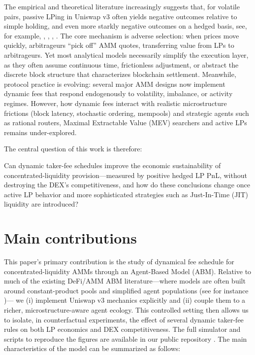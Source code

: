 \documentclass[11pt]{article}
\begin{document}
The empirical and theoretical literature increasingly suggests that, for volatile pairs, passive LPing in Uniswap v3 often yields negative outcomes relative 
to simple holding, and even more starkly negative outcomes on a hedged basis, see, for example, \cite{fritsch2024}, \cite{heimbach2022}, \cite{cohen2023}, \cite{cartea2023}. 
The core mechanism is adverse selection: when prices move quickly, arbitrageurs “pick off” AMM quotes, transferring value from LPs to arbitrageurs. Yet most analytical models
necessarily simplify the execution layer, as they often assume continuous time, frictionless adjustment, or abstract the discrete block structure that 
characterizes blockchain settlement. Meanwhile, protocol practice is evolving: several major AMM designs now implement dynamic fees that respond endogenously 
to volatility, imbalance, or activity regimes. However, how dynamic fees interact with realistic microstructure frictions (block latency, stochastic ordering, mempools) 
and strategic agents such as rational routers, Maximal Extractable Value (MEV) searchers \cite{flashboys} and active LPs remains under-explored.

The central question of this work is therefore:

Can dynamic taker-fee schedules improve the economic sustainability of concentrated-liquidity provision—measured by positive hedged LP PnL, without destroying the DEX’s 
competitiveness, and how do these conclusions change once active LP behavior and more sophisticated strategies such as Just-In-Time (JIT) liquidity \cite{wan2022just} are introduced? 

\section{Main contributions}

This paper’s primary contribution is the study of dynamical fee schedule for concentrated-liquidity AMMs through an Agent-Based Model (ABM).
Relative to much of the existing DeFi/AMM ABM literature---where models are often built around constant-product pools and simplified agent populations (see for instance \cite{angeris2021analysisuniswapmarkets})---
we (i) implement Uniswap v3 mechanics explicitly and (ii) couple them to a richer, microstructure-aware agent ecology. 
This controlled setting then allows us to isolate, in counterfactual experiments, the effect of several dynamic taker-fee rules on both LP economics and DEX competitiveness. 
The full simulator and scripts to reproduce the figures are available in our public repository \cite{abm_uni_v3_repo}.
The main characteristics of the model can be summarized as follows:
\end{document}
